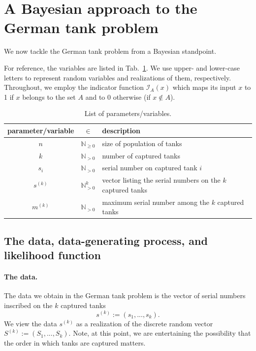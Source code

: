 \documentclass[11pt, oneside]{article}
\begin{document}

\section{A Bayesian approach to the German tank problem}
We now tackle the German tank problem from a Bayesian standpoint. 

For reference, the variables are listed in Tab.~\ref{tab:params}. 
We use upper- and lower-case letters to represent random variables and realizations of them, respectively. 
Throughout, we employ the indicator function $\mathcal{I}_{A}(x)$ which maps its input $x$ to 1 if $x$ belongs to the set $A$ and to 0 otherwise (if $x\notin A$).

\begin{table}[h!]
	\centering
	\caption{List of parameters/variables.} \label{tab:params}
	\begin{tabular}{c c l}
		\toprule
		parameter/variable & $\in$ & description \\
		\midrule
		$n$ & $\mathbb{N}_{\geq 0}$ & size of population of tanks \\
		$k$ & $\mathbb{N}_{>0}$ &  number of captured tanks \\
		$s_i$ & $\mathbb{N}_{>0}$ &  serial number on captured tank $i$ \\
		$s^{(k)}$ & $\mathbb{N}_{>0}^k$ & vector listing the serial numbers on the $k$ captured tanks \\
		$m^{(k)}$ & $\mathbb{N}_{>0}$ &  maximum serial number among the $k$ captured tanks \\
		\bottomrule
	\end{tabular}
\end{table}

\subsection{The data, data-generating process, and likelihood function}
\paragraph{The data.} The data we obtain in the German tank problem is the vector of serial numbers inscribed on the $k$ captured tanks
\begin{equation}
	s^{(k)}:=(s_1,...,s_k).
\end{equation} 
We view the data $s^{(k)}$ as a realization of the discrete random vector $S^{(k)}:=(S_1, ..., S_k)$. Note, at this point, we are entertaining the possibility that the order in which tanks are captured matters.
\end{document}
